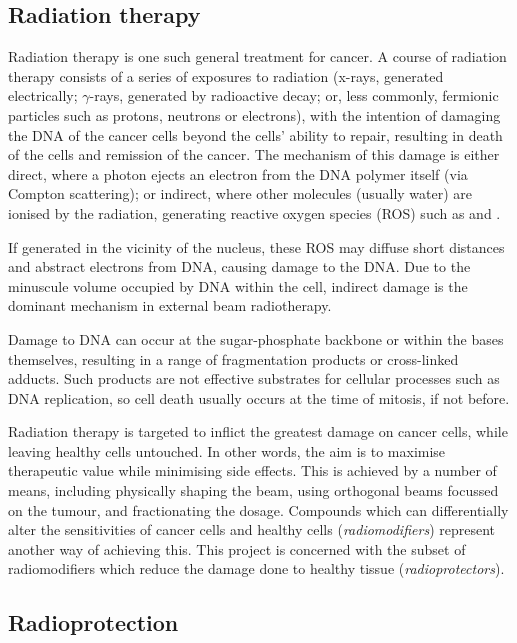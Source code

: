 \begin{refsection}
\subsection{Radiation therapy}
Radiation therapy is one such general treatment for cancer.
A course of radiation therapy consists of a series of exposures to radiation (x-rays, generated electrically; $\gamma$-rays, generated by radioactive decay; or, less commonly, fermionic particles such as protons, neutrons or electrons), with the intention of damaging the DNA of the cancer cells beyond the cells' ability to repair, resulting in death of the cells and remission of the cancer\autocite{Ward1994}.
The mechanism of this damage is either direct, where a photon ejects an electron from the DNA polymer itself (via Compton scattering); or indirect, where other molecules (usually water) are ionised by the radiation, generating reactive oxygen species (ROS) such as  and \autocite{Ward1988}.

If generated in the vicinity of the nucleus, these ROS may diffuse short distances and abstract electrons from DNA, causing damage to the DNA\autocite{Evans2004}.
Due to the minuscule volume occupied by DNA within the cell, indirect damage is the dominant mechanism in external beam radiotherapy\autocite{Ward1988}.

Damage to DNA can occur at the sugar-phosphate backbone or within the bases themselves, resulting in a range of fragmentation products or cross-linked adducts\autocite{Evans2004}.
Such products are not effective substrates for cellular processes such as DNA replication, so cell death usually occurs at the time of mitosis, if not before\autocite{Withers1992}.

Radiation therapy is targeted to inflict the greatest damage on cancer cells, while leaving healthy cells untouched.
In other words, the aim is to maximise therapeutic value while minimising side effects.
This is achieved by a number of means, including physically shaping the beam, using orthogonal beams focussed on the tumour, and fractionating the dosage.
Compounds which can differentially alter the sensitivities of cancer cells and healthy cells (\emph{radiomodifiers}) represent another way of achieving this.
This project is concerned with the subset of radiomodifiers which reduce the damage done to healthy tissue (\emph{radioprotectors}).

\subsection{Radioprotection}


\end{refsection}
